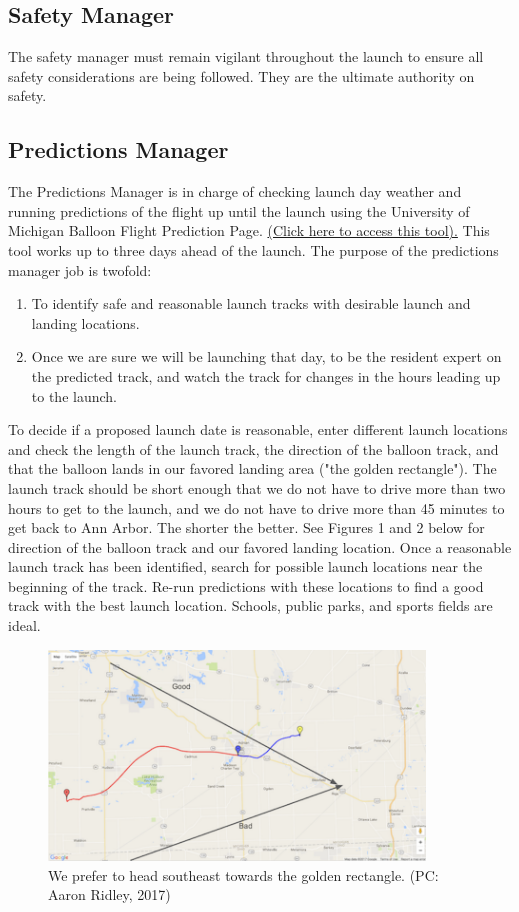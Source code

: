 \documentclass[12pt]{article}
\begin{document}
	\subsection*{Safety Manager}
	The safety manager must remain vigilant throughout the launch to ensure all safety considerations are being followed. They are the ultimate authority on safety.
	
	\subsection*{Predictions Manager}
	The Predictions Manager is in charge of checking launch day weather and running predictions of the flight up until the launch using the University of Michigan Balloon Flight Prediction Page. \href{http://vmr.engin.umich.edu/Model/_balloon/index.py}{(Click here to access this tool).} This tool works up to three days ahead of the launch. The purpose of the predictions manager job is twofold:
	\begin{enumerate}
	    \item To identify safe and reasonable launch tracks with desirable launch and landing locations.
	    
	    \item Once we are sure we will be launching that day, to be the resident expert on the predicted track, and watch the track for changes in the hours leading up to the launch.
	\end{enumerate}
	
	To decide if a proposed launch date is reasonable, enter different launch locations and check the length of the launch track, the direction of the balloon track, and that the balloon lands in our favored landing area ("the golden rectangle"). The launch track should be short enough that we do not have to drive more than two hours to get to the launch, and we do not have to drive more than 45 minutes to get back to Ann Arbor. The shorter the better. See Figures 1 and 2 below for direction of the balloon track and our favored landing location. Once a reasonable launch track has been identified, search for possible launch locations near the beginning of the track. Re-run predictions with these locations to find a good track with the best launch location. Schools, public parks, and sports fields are ideal.
	
	\begin{figure}[h!]
		\begin{center}
			\includegraphics[width = 100mm]{Figures/TrackDirection.png}
			\caption{We prefer to head southeast towards the golden rectangle. (PC: Aaron Ridley, 2017)}
		\end{center}
	\end{figure}
	
\end{document}
